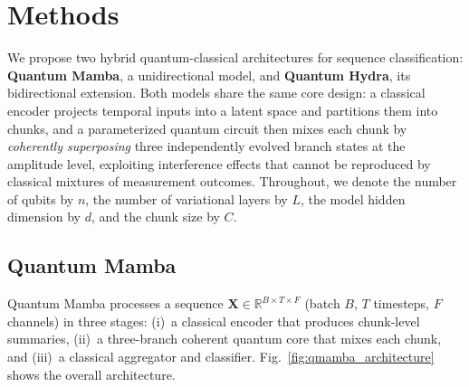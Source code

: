 
\section{Methods}
\label{sec:methods}

We propose two hybrid quantum-classical architectures for sequence classification: \textbf{Quantum Mamba}, a unidirectional model, and \textbf{Quantum Hydra}, its bidirectional extension.
Both models share the same core design: a classical encoder projects temporal inputs into a latent space and partitions them into chunks, and a parameterized quantum circuit then mixes each chunk by \emph{coherently superposing} three independently evolved branch states at the amplitude level, exploiting interference effects that cannot be reproduced by classical mixtures of measurement outcomes.
Throughout, we denote the number of qubits by $n$, the number of variational layers by $L$, the model hidden dimension by $d$, and the chunk size by $C$.

\subsection{Quantum Mamba}
\label{sec:quantum_mamba}

Quantum Mamba processes a sequence $\mathbf{X} \in \mathbb{R}^{B \times T \times F}$ (batch $B$, $T$ timesteps, $F$ channels) in three stages: (i)~a classical encoder that produces chunk-level summaries, (ii)~a three-branch coherent quantum core that mixes each chunk, and (iii)~a classical aggregator and classifier.
Fig.~\ref{fig:qmamba_architecture} shows the overall architecture.

